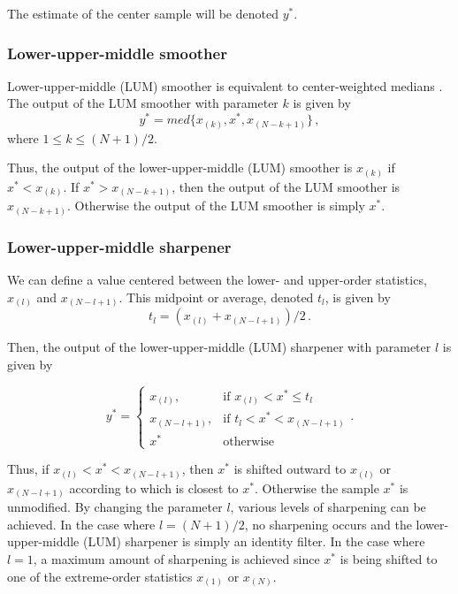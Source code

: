 The estimate of the center sample will be denoted $y^*$.

      \subsubsection{Lower-upper-middle smoother}

Lower-upper-middle (LUM) smoother is equivalent to 
center-weighted medians \cite[]{Justusson81}. The output of the LUM
smoother with parameter $k$ is given by
\begin{equation}
    y^* = med \{x_{(k)},x^*,x_{(N-k+1)}\}\,,
  \label{eq:lumsm} 
\end{equation}
where $1 \le k \le (N+1)/2$.

Thus, the output of the lower-upper-middle (LUM)
smoother is $x_{(k)}$ if $x^* < x_{(k)}$. If $x^* > x_{(N-k+1)}$, then
the output of the LUM smoother is $x_{(N-k+1)}$. Otherwise the output
of the LUM smoother is simply $x^*$.

     \subsubsection{Lower-upper-middle sharpener}

We can define a value centered between the lower- and upper-order
statistics, $x_{(l)}$ and $x_{(N-l+1)}$. This midpoint or average,
denoted $t_l$, is given by
\begin{equation}
   t_l = (x_{(l)}+x_{(N-l+1)})/2\,.
  \label{eq:lumsh1}
\end{equation}

Then, the output of the lower-upper-middle (LUM)
sharpener with parameter $l$ is given by 

\begin{equation}
   y^* = \left\{ \begin{array}{ll} x_{(l)}, &
 \textrm{if $x_{(l)}< x^* \le t_l$}\\ x_{(N-l+1)}, & \textrm{if
 $t_{l}< x^* < x_{(N-l+1)}$}\\ x^* & \textrm{otherwise}
\end{array} \right..
 \label{eq:lumsh2} 
\end{equation}

Thus, if $x_{(l)}<x^*<x_{(N-l+1)}$, then $x^*$ is shifted outward to
$x_{(l)}$ or $x_{(N-l+1)}$ according to which is closest to
$x^*$. Otherwise the sample $x^*$ is unmodified. By changing the
parameter $l$, various levels of sharpening can be achieved.  In the
case where $l=(N+1)/2$, no sharpening occurs and the
lower-upper-middle (LUM) sharpener is simply an
identity filter. In the case where $l=1$, a maximum amount of
sharpening is achieved since $x^*$ is being shifted to one of the
extreme-order statistics $x_{(1)}$ or $x_{(N)}$.

